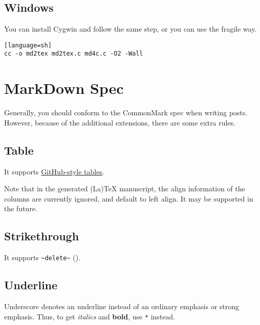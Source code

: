 \subsection{Windows}
You can install Cygwin and follow the same step, or you can use the fragile way.\par
\begin{verbatim}[language=sh]
cc -o md2tex md2tex.c md4c.c -O2 -Wall
\end{verbatim}
\section{MarkDown Spec}
Generally, you should conform to the CommonMark spec when writing posts. However, because of the additional extensions, there are some extra rules.\par
\subsection{Table}
It supports \href{https://github.com/github/docs/blob/main/content/get-started/writing-on-github/working-with-advanced-formatting/organizing-information-with-tables.md}{GitHub-style tables}.\par
Note that in the generated (La)TeX manuscript, the align information of the columns are currently ignored, and default to left align. It may be supported in the future.\par
\subsection{Strikethrough}
It supports \verb!~delete~! ().\par
\subsection{Underline}
Underscore denotes an underline instead of an ordinary emphasis or strong emphasis. Thus, to get \textit{italics} and \textbf{bold}, use \verb!*! instead.\par
